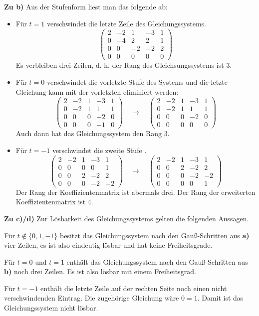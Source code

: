 {\bigskip
\textbf{Zu b)} Aus der Stufenform liest man das folgende ab:
\begin{itemize}
\item F\"ur $t=1$ verschwindet die letzte Zeile des Gleichungssystems. 
$$\left(\begin{array}{rrrr|r}
2 & -2 & 1 & -3 & 1\\
0 & -4 & 2 & 2& 1\\
0 &  0 & -2 & -2& 2 \\
0 &  0 & 0 & 0 & 0
\end{array}\right)
$$
Es verbleiben drei Zeilen,
d. h. der Rang des Gleichsungssystems ist 3. 
\item F\"ur $t=0$ verschwindet die vorletzte Stufe des Systems und die letzte Gleichung kann mit der
vorletzten eliminiert werden:
$$\left(\begin{array}{rrrr|r}
2 & -2 & 1 & -3 & 1\\
0 & -2 & 1 & 1& 1\\
0 &  0 &  0 & -2& 0 \\
0 &  0 & 0 & -1& 0
\end{array}\right) \quad\rightarrow\quad
\left(\begin{array}{rrrr|r}
2 & -2 & 1 & -3 & 1\\
0 & -2 & 1 & 1& 1\\
0 &  0 &  0 & -2& 0 \\
0 &  0 & 0 &  0& 0
\end{array}\right)
$$
 Auch dann hat das Gleichungssystem den Rang 3. 
\item F\"ur $t=-1$ verschwindet die zweite Stufe . 
$$\left(\begin{array}{rrrr|r}
2 & -2 & 1 & -3 & 1\\
0 &  0 & 0 & 0& 1\\
0 &  0 &  2 & -2& 2 \\
0 &  0 & 0 & -2& -2
\end{array}\right)\quad\rightarrow\quad 
\left(\begin{array}{rrrr|r}
2 & -2 & 1 & -3 & 1\\
0 &  0 &  2 & -2& 2 \\
0 &  0 & 0 & -2& -2\\
0 &  0 & 0 & 0& 1
\end{array}\right)
$$
Der Rang der Koeffizientenmatrix ist abermals drei. Der Rang der erweiterten Koeffizientenmatrix ist 4.
\end{itemize}
\bigskip
\textbf{Zu c)/d)} Zur L\"osbarkeit des Gleichungssystems gelten die folgenden Aussagen.
\begin{iii}
 \item F\"ur $t\not\in\{0,1,-1\}$ besitzt das Gleichungssystem nach den Gauß-Schritten
 aus \textbf{a)} vier Zeilen, es ist also eindeutig 
lösbar und hat keine Freiheitsgrade. 
\item Für $t=0$ und $t=1$  enth\"alt das Gleichungssystem nach den Gauß-Schritten aus \textbf{b)}
 noch drei Zeilen. Es ist also l\"osbar mit einem Freiheitsgrad. 
\item Für $t=-1$ enth\"alt die letzte Zeile auf der rechten Seite noch einen nicht verschwindenden
Eintrag. Die zugeh\"orige Gleichung w\"are $0=1$. Damit ist das Gleichungssystem nicht l\"osbar. 
\end{iii}

}
